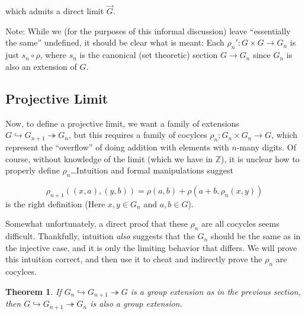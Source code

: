 \documentclass[12pt]{article}
\newtheorem{thm}{Theorem}
\theoremstyle{definition}
\newcommand{\Z}{\mathbb{Z}}
\newcommand{\mono}{\hookrightarrow}
\newcommand{\epi}{\twoheadrightarrow}
\begin{document}
  which admits a direct limit $\overrightarrow{G}$.

  Note: While we (for the purposes of this informal discussion) leave 
  ``essentially the same'' undefined, it should be clear what is meant:
  Each $\rho_n' : G \times G \to G_n$ is just $s_n \circ \rho$, 
  where $s_n$ is the canonical (set theoretic) section $G \to G_n$ 
  since $G_n$ is also an extension of $G$.

  \subsection{Projective Limit}

  Now, to define a projective limit, we want a family of extensions
  $G \mono G_{n+1} \epi G_n$, but this requires a family of cocylces
  $\rho_n : G_n \times G_n \to G$, which represent the ``overflow'' of
  doing addition with elements with $n$-many digits. Of course, without
  knowledge of the limit (which we have in $\Z$), it is unclear how to 
  properly define $\rho_n$\ldots Intuition and formal manipulations suggest

  \[
    \rho_{n+1}((x,a),(y,b)) = \rho(a,b) + \rho(a+b, \rho_n(x,y))
    \tag{1}
  \]
  is the right definition (Here $x,y \in G_n$ and $a,b \in G$). 

  Somewhat unfortunately, a direct proof that these $\rho_n$ are all cocycles
  seems difficult. Thankfully, intuition \emph{also} suggests that the $G_n$
  should be the same as in the injective case, and it is only the limiting
  behavior that differs. We will prove this intuition correct, and then use
  it to cheat and indirectly prove the $\rho_n$ are cocylces.

  \begin{thm}
    If $G_n \mono G_{n+1} \epi G$ is a group extension as in the previous
    section, then $G \mono G_{n+1} \epi G_n$ is \emph{also} a group extension.
  \end{thm}
\end{document}
